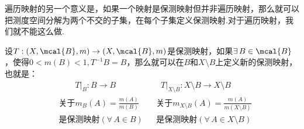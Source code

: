 遍历映射的另一个意义是，如果一个映射是保测映射但并非遍历映射，那么就可以把测度空间分解为两个不交的子集，在每个子集定义保测映射.对于遍历映射，我们就不能这么做.\par
设$T:(X,\mcal{B},m)\to(X,\mcal{B},m)$是保测映射，如果$\exists\, B\in\mcal{B}$，使得$0<m(B)<1,T^{-1}B=B$，那么就可以在$B$和$X\setminus B$上定义新的保测映射，也就是：
{\setjot[-3]\begin{align*}
    &\qquad T|_B:B\to B  & &\;\; T|_{X\setminus B}:X\setminus B\to X\setminus B \\
    &\text{关于}m_B(A)=\frac{m(A)}{m(B)} & &\text{关于}m_{X\setminus B}(A)=\frac{m(A)}{m(X\setminus B)} \\
    &\text{是保测映射}(\forall\, A\in B) & &\text{是保测映射}(\forall\, A\in X\setminus B)
\end{align*}}

